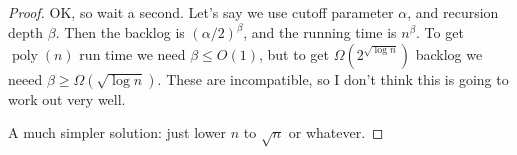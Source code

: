 \documentclass{article}[11pt]
\DeclareMathOperator{\poly}{\text{poly}}
\begin{document}
\begin{proof}
  {\color{blue}
    OK, so wait a second. Let's say we use cutoff parameter $\alpha$, and recursion depth $\beta$. Then the backlog is 
    $(\alpha/2)^\beta$, and the running time is $n^\beta$. To get $\poly(n)$ run
    time we need $\beta \le O(1)$, but to get $\Omega(2^{\sqrt{\log n}})$ backlog we
    neeed $\beta \ge \Omega(\sqrt{\log n})$. These are incompatible, so I don't
    think this is going to work out very well.
  }

  A much simpler solution: just lower $n$ to $\sqrt{n}$ or whatever. 

\end{proof}
\end{document}
